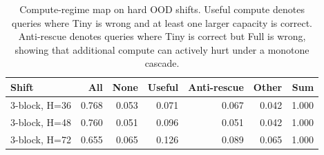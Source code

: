 \begin{table}[t]
\centering
\small
\begin{tabular}{lrrrrrr}
\toprule
Shift & All & None & Useful & Anti-rescue & Other & Sum \\
\midrule
3-block, H=36 & 0.768 & 0.053 & 0.071 & 0.067 & 0.042 & 1.000 \\
3-block, H=48 & 0.760 & 0.051 & 0.096 & 0.051 & 0.042 & 1.000 \\
3-block, H=72 & 0.655 & 0.065 & 0.126 & 0.089 & 0.065 & 1.000 \\
\bottomrule
\end{tabular}
\caption{Compute-regime map on hard OOD shifts. Useful compute denotes queries where Tiny is wrong and at least one larger capacity is correct. Anti-rescue denotes queries where Tiny is correct but Full is wrong, showing that additional compute can actively hurt under a monotone cascade.}
\label{tab:compute_regime_map}
\end{table}
